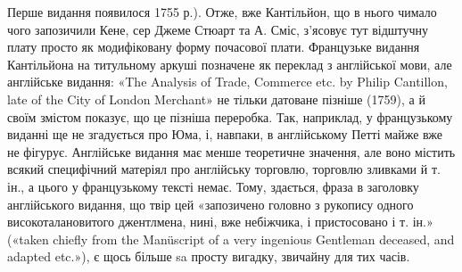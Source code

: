 Перше видання появилося 1755 р.). Отже, вже Кантільйон, що в нього
чимало чого запозичили Кене, сер Джеме Стюарт та А. Сміс, з'ясовує
тут відштучну плату просто як модифіковану форму почасової плати.
Французьке видання Кантільйона на титульному аркуші позначене як
переклад з англійської мови, але англійське видання: «The Analysis
of Trade, Commerce etc. by Philip Cantillon, late of the City of London
Merchant» не тільки датоване пізніше (1759), а й своїм змістом показує,
що це пізніша переробка. Так, наприклад, у французькому виданні ще
не згадується про Юма, і, навпаки, в англійському Петті майже вже не
фігурує. Англійське видання має менше теоретичне значення, але воно
містить всякий специфічний матеріял про англійську торговлю, торговлю
зливками й т. ін., а цього у французькому тексті немає. Тому, здається,
фраза в заголовку англійського видання, що твір цей «запозичено головно
з рукопису одного високоталановитого джентлмена, нині, вже небіжчика,
і пристосовано і т. ін.» («taken chiefly from the Manüscript of
a very ingenious Gentleman deceased, and adapted etc.»), є щось більше
sa просту вигадку, звичайну для тих часів.
\parbreak{}  %
